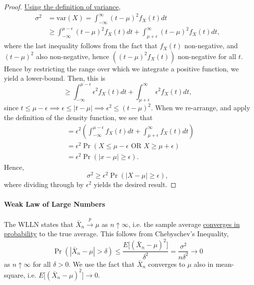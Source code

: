 \documentclass[12pt]{article}  \usepackage{algorithm2e} \usepackage{amsmath} \usepackage{amsthm} \usepackage{amsfonts} \usepackage{bbm} \usepackage{color,soul} \usepackage{framed} \usepackage[margin=0.5in]{geometry} \usepackage{hyperref} \usepackage{mathtools} \usepackage[dvipsnames]{xcolor}
\begin{document}
\begin{proof}   
\ul{Using the definition of variance},
\begin{align*}     
  \sigma^2 &= \textrm{var}(X) = \int_{-\infty}^\infty (t - \mu)^2 f_X(t) dt \\
           &\geq \int_{-\infty}^{\mu - \epsilon} (t - \mu)^2 f_X(t) dt + \int_{\mu + \epsilon}^\infty (t- \mu)^2 f_X(t) dt,   
\end{align*}
  where the last inequality follows from the fact that $f_X(t)$ non-negative, and $(t-\mu)^2$ also non-negative, hence $\left((t-\mu)^2f_X(t)\right)$
non-negative for all $t$. Hence by restricting the range over which we integrate a positive function, we yield a lower-bound. Then, this is
\[
\geq \int_{-\infty}^{\mu - \epsilon} \epsilon^2 f_X(t) dt + \int_{\mu + \epsilon}^\infty \epsilon^2 f_X(t) dt,
\]
since $t \leq \mu - \epsilon \implies \epsilon \leq |t-\mu| \implies \epsilon^2 \leq (t-\mu)^2$. When we re-arrange, and apply the definition of the density function, we see that
\begin{align*}   &= \epsilon^2 \left(\int_{-\infty}^{\mu - \epsilon} f_X(t) dt + \int_{\mu + \epsilon}^{\infty} f_X(t) dt \right) \\
  &= \epsilon^2 \Pr(X \leq \mu - \epsilon \textrm{ OR } X \geq \mu + \epsilon) \\
  &= \epsilon^2 \Pr \left( |x - \mu| \geq \epsilon \right).  \end{align*}
Hence,
\[
  \sigma^2 \geq \epsilon^2 \Pr(|X-\mu| \geq \epsilon),
\]
where dividing through by $\epsilon^2$ yields the desired result. 
\end{proof}

\paragraph{Weak Law of Large Numbers} The WLLN states that $\bar{X}_n \overset{p}{\longrightarrow} \mu$ as $n \uparrow \infty$, i.e. the sample average 
\ul{converges in probability} to the true average. This follows from Chebyschev's Inequality,
\[
\Pr(|\bar{X}_n - \mu| > \delta) \leq \frac{E \big[ (\bar{X}_n - \mu)^2 \big]}{\delta^2} = \frac{\sigma^2}{n\delta^2} \longrightarrow 0
\]
as $n \uparrow \infty$ for all $\delta > 0$. We use the fact that $\bar{X}_n$ converges to $\mu$ also in mean-square, i.e. $E\big[ (\bar{X}_n - \mu)^2 \big] \longrightarrow 0$.
\end{document}
